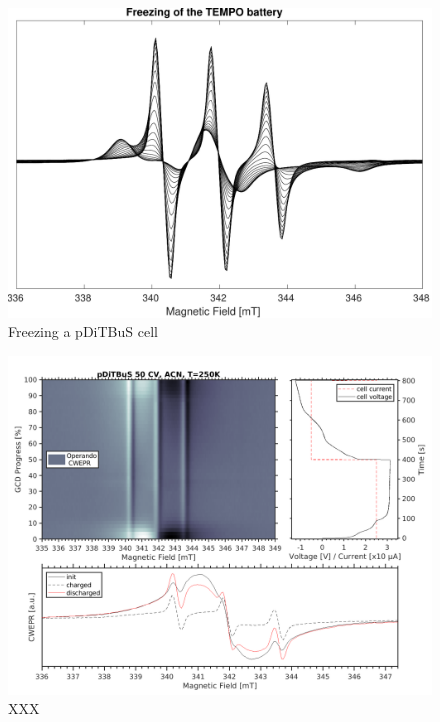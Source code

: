 \begin{figure}[h]
\center
	\includegraphics[width=1\textwidth]{./operando_epr/figures/CRYO/freezing_sandwich_230K_200K.pdf}
	\caption{Freezing a pDiTBuS cell}
	\label{fig:freezing_of_pditbus_battery_1D}
\end{figure}


\begin{figure}[h]
\center
	\includegraphics[width=1\textwidth]{./operando_epr/figures/slowcharge_231117_liquid_250K.pdf}
	\caption{XXX}
	\label{fig:operando_cold_cycle}
\end{figure}














